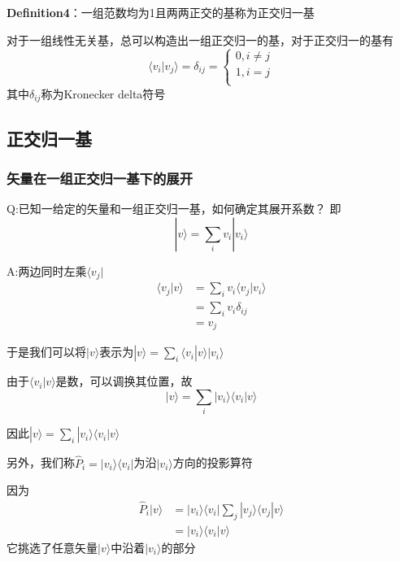\documentclass[lang=cn,10pt]{elegantbook}
\begin{document}
\textbf{Definition4}：一组范数均为1且两两正交的基称为正交归一基

对于一组线性无关基，总可以构造出一组正交归一的基，对于正交归一的基有
\begin{equation}
	\langle v_i|v_j\rangle =\delta _{ij}=\begin{cases}
		0,i\ne j\\
		1,i=j\\
	\end{cases}
\end{equation}
其中$\delta _{ij}$称为Kronecker delta符号

\subsection{正交归一基}
\subsubsection{矢量在一组正交归一基下的展开}
Q:已知一给定的矢量和一组正交归一基，如何确定其展开系数？
即\begin{equation*}
	|v\rangle=\sum_{i}v_i|v_i\rangle
\end{equation*}

A:两边同时左乘$\langle v_j|$
\begin{equation*}
	\begin{split}
		\langle v_j|v\rangle&=\sum_{i}v_i\langle v_j|v_i\rangle\\
		&=\sum_{i}v_i\delta_{ij}\\
		&=v_j
	\end{split}
\end{equation*}

于是我们可以将$|v\rangle$表示为$|v\rangle=\sum_{i}	\langle v_i|v\rangle|v_i\rangle$

由于$\langle v_i|v\rangle$是数，可以调换其位置，故
\begin{equation*}
	|v\rangle =\sum_i{|v_i\rangle \langle v_i|v\rangle}
\end{equation*}

因此$ |v\rangle =\sum_i|v_i\rangle \langle v_i|v\rangle$
	
另外，我们称$\hat{P}_i=|v_i\rangle \langle v_i|$为沿$|v_i\rangle$方向的投影算符

因为
\begin{equation*}
	\begin{split}
		\hat{P}_i|v\rangle &=|v_i\rangle \langle v_i|\sum_j|v_j\rangle \langle v_j|v\rangle\\
		&=|v_i\rangle \langle v_i|v\rangle
	\end{split}
\end{equation*}
它挑选了任意矢量$|v\rangle$中沿着$|v_i\rangle$的部分
\end{document}
